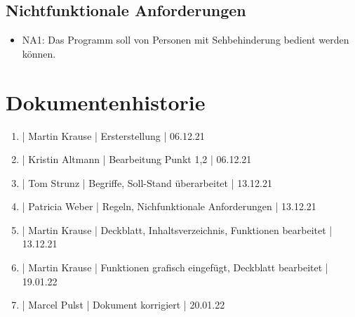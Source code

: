 \documentclass[12pt]{scrartcl}
\begin{document}
\subsection{Nichtfunktionale Anforderungen}

\begin{itemize}
	\item NA1: Das Programm soll von Personen mit Sehbehinderung bedient werden können.
\end{itemize}

\section{Dokumentenhistorie}

\begin{enumerate}
	\item | Martin Krause | Ersterstellung | 06.12.21
	\item | Kristin Altmann | Bearbeitung Punkt 1,2  | 06.12.21
	\item | Tom Strunz | Begriffe, Soll-Stand überarbeitet | 13.12.21
	\item | Patricia Weber | Regeln, Nichfunktionale Anforderungen | 13.12.21
	\item | Martin Krause | Deckblatt, Inhaltsverzeichnis, Funktionen bearbeitet | 13.12.21
	\item | Martin Krause | Funktionen grafisch eingefügt, Deckblatt bearbeitet | 19.01.22
	\item | Marcel Pulst | Dokument korrigiert | 20.01.22
\end{enumerate}
 
\end{document}
